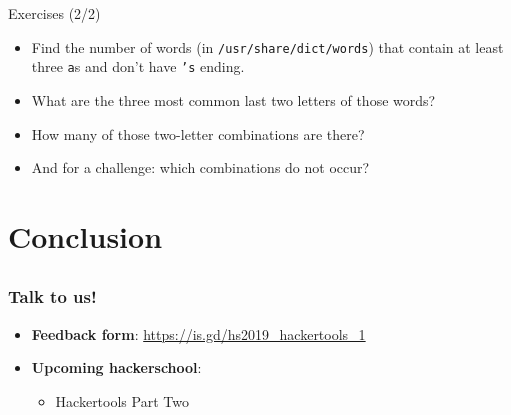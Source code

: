 \documentclass[12pt]{beamer}
\begin{document}
\begin{frame}{Exercises (2/2)}
  \begin{itemize}
    \item Find the number of words (in \texttt{/usr/share/dict/words}) that contain at least three \texttt{a}s and don’t have \texttt{'s} ending.
    \item What are the three most common last two letters of those words?
    \item How many of those two-letter combinations are there?
    \item And for a challenge: which combinations do not occur?
  \end{itemize}
\end{frame}

\section{Conclusion}
\subsection{}
\begin{frame}
  \frametitle{Talk to us!}
  \begin{itemize}
    \item \textbf{Feedback form}: \url{https://is.gd/hs2019_hackertools_1}
    \item \textbf{Upcoming hackerschool}:
          \begin{itemize}
            \item Hackertools Part Two
          \end{itemize}
  \end{itemize}
\end{frame}
\end{document}
